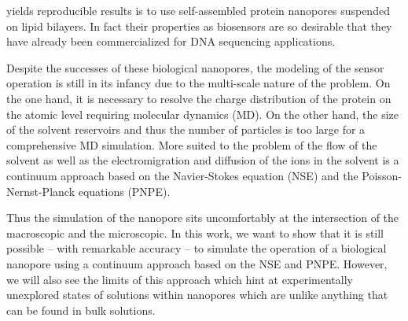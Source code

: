 \documentclass[journal=ancac3,manuscript=article,etalmode=truncate,maxauthors=0,layout=twocolumn]{achemso}
\begin{document}
  
 
yields reproducible results is to use self-assembled protein nanopores suspended on lipid 
bilayers\cite{Deamer-2016}.
In fact their properties as biosensors are so desirable that they have already been commercialized for DNA
sequencing applications.

Despite the successes of these biological nanopores, the modeling of the sensor operation is still in its 
infancy due to the multi-scale nature of the problem. On the one hand, it is necessary to resolve the charge 
distribution of the protein on the atomic level requiring molecular dynamics (MD).  On the other 
hand, the size of the solvent reservoirs and thus the number of particles is too large for a comprehensive MD 
simulation. More suited to the problem of the flow of the solvent as well as the electromigration and 
diffusion of the ions in the solvent is a continuum approach based on the Navier-Stokes equation (NSE) and 
the Poisson-Nernst-Planck equations (PNPE).

Thus the simulation of the nanopore sits uncomfortably at the intersection of the macroscopic and the
microscopic. In this work, we want to show that it is still possible -- with remarkable accuracy -- to 
simulate the operation of a biological nanopore using a continuum approach based on the NSE and PNPE. 
However, we will also see the limits of this approach which hint at experimentally unexplored states of
solutions within nanopores which are unlike anything that can be found in bulk solutions.
\end{document}
